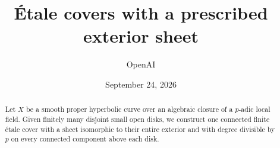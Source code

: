 \documentclass[11pt]{article}
\title{\'{E}tale covers with a prescribed exterior sheet}
\author{OpenAI}
\date{September 24, 2026}
\numberwithin{equation}{section}
\theoremstyle{remark}
\begin{document}
\maketitle
\begin{abstract}
Let $X$ be a smooth proper hyperbolic curve over an algebraic closure
of a $p$-adic local field. Given finitely many disjoint small open disks,
we construct one connected finite \'etale cover with a sheet isomorphic
to their entire exterior and with degree divisible by $p$ on every
connected component above each disk.
\end{abstract}

\tableofcontents





\begingroup
\raggedright


\endgroup
\end{document}
